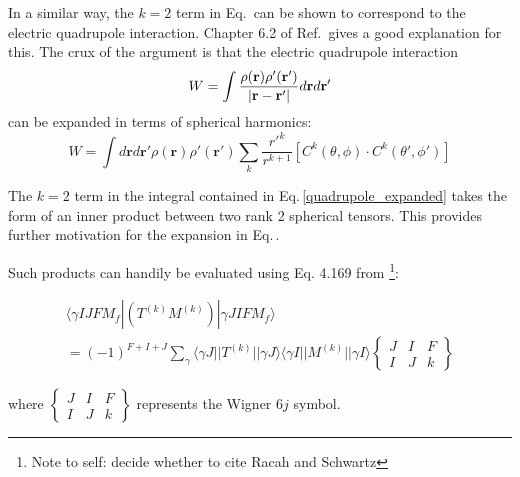 In a similar way, the $k=2$ term in Eq.\,\label{TkMk_hyperfine} can be shown to correspond to the electric quadrupole interaction. Chapter 6.2 of Ref.\,\cite{sobelman_spectra} gives a good explanation for this. The crux of the argument is that the electric quadrupole interaction  
\begin{equation}
W=\int\frac{\rho(\mathbf{r})\rho'(\mathbf{r}')}{|\mathbf{r}-\mathbf{r}'|}d\mathbf{r}d\mathbf{r'}\\
\end{equation}
can  be expanded in terms of spherical harmonics: 
\begin{equation}
W=\int d\mathbf{r}d\mathbf{r'}
\rho(\mathbf{r})\rho'(\mathbf{r}')\sum_k \frac{r'^k}{r^{k+1}}[C^k(\theta,\phi)\cdot C^k(\theta',\phi')] \label{quadrupole_expanded}
\end{equation}

The $k=2$ term in the integral contained in Eq.\,\ref{quadrupole_expanded} takes the form of an inner product between two rank 2 spherical tensors. This provides further motivation for the expansion in Eq.\,\cite{TkMk_hyperfine}.

Such products can handily be evaluated using Eq. 4.169 from \cite{sobelman_spectra}\footnote{Note to self: decide whether to cite Racah and Schwartz}:


\begin{multline}\label{4169_combine_diff_tensors}
\langle\gamma I J F M_f|(T^{(k)}M^{(k)})|\gamma J I F M_f\rangle \\
=
(-1)^{F+I+J} \sum_{\gamma} \langle\gamma J||T^{(k)}||\gamma J\rangle
\langle\gamma I || M^{(k)} ||\gamma I\rangle
\begin{Bmatrix}
J & I & F \\
I & J & k
\end{Bmatrix}
\end{multline}

where 
$\begin{Bmatrix}
J & I & F \\
I & J & k
\end{Bmatrix}$ represents the Wigner $6j$ symbol. 

